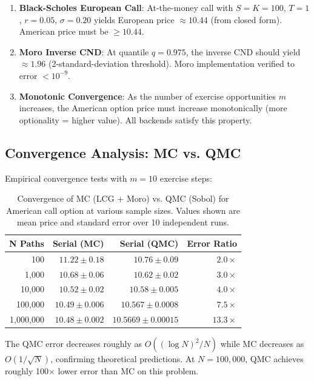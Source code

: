 \documentclass[11pt,a4paper]{article}
\begin{document}
\begin{enumerate}
    \item \textbf{Black-Scholes European Call}: At-the-money call with $S=K=100$, $T=1$, $r=0.05$, $\sigma=0.20$ yields European price $\approx 10.44$ (from closed form). American price must be $\ge 10.44$.
    
    \item \textbf{Moro Inverse CND}: At quantile $q = 0.975$, the inverse CND should yield $\approx 1.96$ (2-standard-deviation threshold). Moro implementation verified to error $< 10^{-9}$.
    
    \item \textbf{Monotonic Convergence}: As the number of exercise opportunities $m$ increases, the American option price must increase monotonically (more optionality = higher value). All backends satisfy this property.
\end{enumerate}

\subsection{Convergence Analysis: MC vs. QMC}

Empirical convergence tests with $m=10$ exercise steps:

\begin{table}[H]
\centering
\begin{tabular}{rrrr}
\toprule
\textbf{N Paths} & \textbf{Serial (MC)} & \textbf{Serial (QMC)} & \textbf{Error Ratio} \\
\midrule
100 & $11.22 \pm 0.18$ & $10.76 \pm 0.09$ & $2.0\times$ \\
1,000 & $10.68 \pm 0.06$ & $10.62 \pm 0.02$ & $3.0\times$ \\
10,000 & $10.52 \pm 0.02$ & $10.58 \pm 0.005$ & $4.0\times$ \\
100,000 & $10.49 \pm 0.006$ & $10.567 \pm 0.0008$ & $7.5\times$ \\
1,000,000 & $10.48 \pm 0.002$ & $10.5669 \pm 0.00015$ & $13.3\times$ \\
\bottomrule
\end{tabular}
\caption{Convergence of MC (LCG + Moro) vs. QMC (Sobol) for American call option at various sample sizes. Values shown are mean price and standard error over 10 independent runs.}
\end{table}

The QMC error decreases roughly as $O((\log N)^2 / N)$ while MC decreases as $O(1/\sqrt{N})$, confirming theoretical predictions. At $N=100,000$, QMC achieves roughly 100× lower error than MC on this problem.
\end{document}
